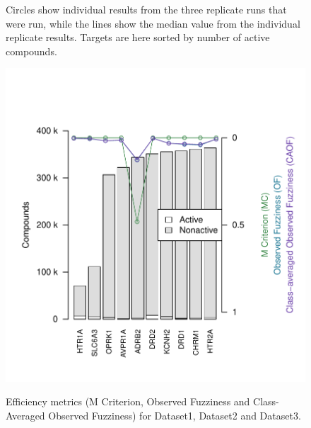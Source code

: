 \documentclass[utf8]{frontiersSCNS} %
\newcommand{\inlinetodo}[1]{{\color{magenta}\oldtodo[inline]{\color{white}\textsf{\small#1}}}}
\begin{document}
\begin{figure}[h!]
\begin{minipage}[t]{0.62\textwidth}
{            Circles show individual results from the three replicate runs that were
            run, while the lines show the median value from the individual replicate
            results. Targets are here sorted by number of active compounds.}
        \label{fig:21small_fill}
    \end{minipage}
    \begin{minipage}[t]{0.38\textwidth}
        \includegraphics[width=\textwidth]{figures/fig3c_10large.pdf}
        \label{fig:10large}
    \end{minipage}
    \caption{Efficiency metrics (M Criterion, Observed Fuzziness and
    Class-Averaged Observed Fuzziness) for Dataset1, Dataset2 and Dataset3.}
\end{figure}

%
%
\end{document}
